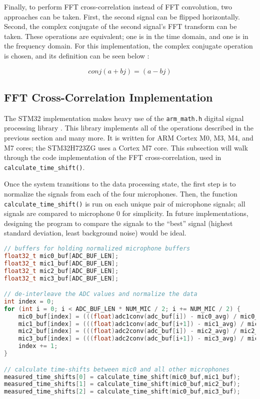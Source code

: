 \documentclass[11pt]{ucthesisCP}
\begin{document}
Finally, to perform FFT cross-correlation instead of FFT convolution, two approaches can be taken. First, the second signal can be flipped horizontally. Second, the complex conjugate of the second signal’s FFT transform can be taken. These operations are equivalent; one is in the time domain, and one is in the frequency domain. For this implementation, the complex conjugate operation is chosen, and its definition can be seen below \cite{dspguide}:

\begin{equation} \label{eq:3eq3}
	conj(a + bj) = (a - bj)
\end{equation}

\subsection{FFT Cross-Correlation Implementation} \label{ssec:3s8s2}
The STM32 implementation makes heavy use of the \verb|arm_math.h| digital signal processing library \cite{arm}. This library implements all of the operations described in the previous section and many more. It is written for ARM Cortex M0, M3, M4, and M7 cores; the STM32H723ZG uses a Cortex M7 core. This subsection will walk through the code implementation of the FFT cross-correlation, used in \verb|calculate_time_shift()|.

Once the system transitions to the data processing state, the first step is to normalize the signals from each of the four microphones. Then, the function \verb|calculate_time_shift()| is run on each unique pair of microphone signals; all signals are compared to microphone 0 for simplicity. In future implementations, designing the program to compare the signals to the “best” signal (highest standard deviation, least background noise) would be ideal.

\begin{lstlisting}[language=C++]
// buffers for holding normalized microphone buffers
float32_t mic0_buf[ADC_BUF_LEN];
float32_t mic1_buf[ADC_BUF_LEN];
float32_t mic2_buf[ADC_BUF_LEN];
float32_t mic3_buf[ADC_BUF_LEN];

// de-interleave the ADC values and normalize the data
int index = 0;
for (int i = 0; i < ADC_BUF_LEN * NUM_MIC / 2; i += NUM_MIC / 2) {
	mic0_buf[index] = (((float)adc1conv(adc_buf[i]) - mic0_avg) / mic0_stdev);
	mic1_buf[index] = (((float)adc1conv(adc_buf[i+1]) - mic1_avg) / mic1_stdev);
	mic2_buf[index] = (((float)adc2conv(adc_buf[i]) - mic2_avg) / mic2_stdev);
	mic3_buf[index] = (((float)adc2conv(adc_buf[i+1]) - mic3_avg) / mic3_stdev);
	index += 1;
}

// calculate time-shifts between mic0 and all other microphones
measured_time_shifts[0] = calculate_time_shift(mic0_buf,mic1_buf);
measured_time_shifts[1] = calculate_time_shift(mic0_buf,mic2_buf);
measured_time_shifts[2] = calculate_time_shift(mic0_buf,mic3_buf);
\end{lstlisting}
\end{document}
